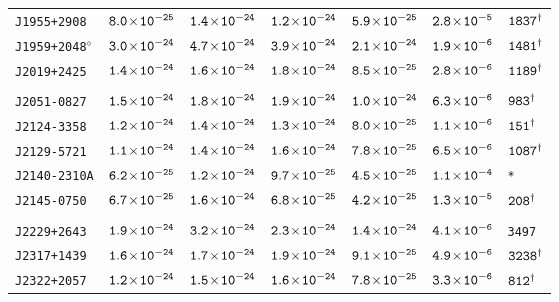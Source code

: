 \begin{longtable}{l | c | c | c | c | c | l}
\scriptsize{\tt{J1955+2908}} & \scriptsize{$\tt{8.0\!\times\!10^{-25}}$} & \scriptsize{$\tt{1.4\!\times\!10^{-24}}$} & \scriptsize{$\tt{1.2\!\times\!10^{-24}}$} & \scriptsize{$\tt{5.9\!\times\!10^{-25}}$} & \scriptsize{$\tt{2.8\!\times\!10^{-5}}$} & \scriptsize{$\tt{1837^{\dagger}}$} \\[-16pt] 
\scriptsize{\tt{J1959+2048}$^{\diamond}$} & \scriptsize{$\tt{3.0\!\times\!10^{-24}}$} &
\scriptsize{$\tt{4.7\!\times\!10^{-24}}$} & \scriptsize{$\tt{3.9\!\times\!10^{-24}}$} & \scriptsize{$\tt{2.1\!\times\!10^{-24}}$}
& \scriptsize{$\tt{1.9\!\times\!10^{-6}}$} & \scriptsize{$\tt{1481^{\dagger}}$} \\[-16pt] 
\scriptsize{\tt{J2019+2425}} & \scriptsize{$\tt{1.4\!\times\!10^{-24}}$} & \scriptsize{$\tt{1.6\!\times\!10^{-24}}$} & \scriptsize{$\tt{1.8\!\times\!10^{-24}}$} & \scriptsize{$\tt{8.5\!\times\!10^{-25}}$} & \scriptsize{$\tt{2.8\!\times\!10^{-6}}$} & \scriptsize{$\tt{1189^{\dagger}}$} \\[-16pt] 
\\[-20pt] 
\scriptsize{\tt{J2051-0827}} & \scriptsize{$\tt{1.5\!\times\!10^{-24}}$} & \scriptsize{$\tt{1.8\!\times\!10^{-24}}$} & \scriptsize{$\tt{1.9\!\times\!10^{-24}}$} & \scriptsize{$\tt{1.0\!\times\!10^{-24}}$} & \scriptsize{$\tt{6.3\!\times\!10^{-6}}$} & \scriptsize{$\tt{983^{\dagger}}$} \\[-16pt] 
\scriptsize{\tt{J2124-3358}} & \scriptsize{$\tt{1.2\!\times\!10^{-24}}$} & \scriptsize{$\tt{1.4\!\times\!10^{-24}}$} & \scriptsize{$\tt{1.3\!\times\!10^{-24}}$} & \scriptsize{$\tt{8.0\!\times\!10^{-25}}$} & \scriptsize{$\tt{1.1\!\times\!10^{-6}}$} & \scriptsize{$\tt{151^{\dagger}}$} \\[-16pt] 
\scriptsize{\tt{J2129-5721}} & \scriptsize{$\tt{1.1\!\times\!10^{-24}}$} & \scriptsize{$\tt{1.4\!\times\!10^{-24}}$} & \scriptsize{$\tt{1.6\!\times\!10^{-24}}$} & \scriptsize{$\tt{7.8\!\times\!10^{-25}}$} & \scriptsize{$\tt{6.5\!\times\!10^{-6}}$} & \scriptsize{$\tt{1087^{\dagger}}$} \\[-16pt] 
\scriptsize{\tt{J2140-2310A}} & \scriptsize{$\tt{6.2\!\times\!10^{-25}}$} & \scriptsize{$\tt{1.2\!\times\!10^{-24}}$} & \scriptsize{$\tt{9.7\!\times\!10^{-25}}$} & \scriptsize{$\tt{4.5\!\times\!10^{-25}}$} & \scriptsize{$\tt{1.1\!\times\!10^{-4}}$} & \scriptsize{\tt{*}} \\[-16pt] 
\scriptsize{\tt{J2145-0750}} & \scriptsize{$\tt{6.7\!\times\!10^{-25}}$} & \scriptsize{$\tt{1.6\!\times\!10^{-24}}$} & \scriptsize{$\tt{6.8\!\times\!10^{-25}}$} & \scriptsize{$\tt{4.2\!\times\!10^{-25}}$} & \scriptsize{$\tt{1.3\!\times\!10^{-5}}$} & \scriptsize{$\tt{208^{\dagger}}$} \\[-16pt] 
\\[-20pt] 
\scriptsize{\tt{J2229+2643}} & \scriptsize{$\tt{1.9\!\times\!10^{-24}}$} & \scriptsize{$\tt{3.2\!\times\!10^{-24}}$} & \scriptsize{$\tt{2.3\!\times\!10^{-24}}$} &\scriptsize{$\tt{1.4\!\times\!10^{-24}}$} & \scriptsize{$\tt{4.1\!\times\!10^{-6}}$} & \scriptsize{\tt{3497}} \\[-16pt] 
\scriptsize{\tt{J2317+1439}} & \scriptsize{$\tt{1.6\!\times\!10^{-24}}$} & \scriptsize{$\tt{1.7\!\times\!10^{-24}}$} & \scriptsize{$\tt{1.9\!\times\!10^{-24}}$} & \scriptsize{$\tt{9.1\!\times\!10^{-25}}$} & \scriptsize{$\tt{4.9\!\times\!10^{-6}}$} & \scriptsize{$\tt{3238^{\dagger}}$} \\[-16pt] 
\scriptsize{\tt{J2322+2057}} & \scriptsize{$\tt{1.2\!\times\!10^{-24}}$} & \scriptsize{$\tt{1.5\!\times\!10^{-24}}$} & \scriptsize{$\tt{1.6\!\times\!10^{-24}}$} & \scriptsize{$\tt{7.8\!\times\!10^{-25}}$} & \scriptsize{$\tt{3.3\!\times\!10^{-6}}$} & \scriptsize{$\tt{812^{\dagger}}$} \\[-16pt] 
\end{longtable}
